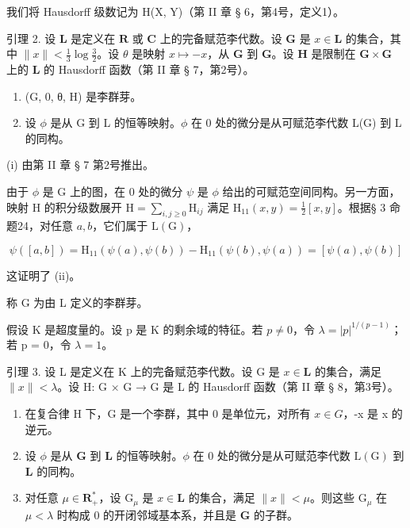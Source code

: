 我们将 Hausdorff 级数记为 H(X, Y)（第 II 章 § 6，第4号，定义1）。

引理 2. 设 \(\mathbf{L}\) 是定义在 \(\mathbf{R}\) 或 \(\mathbf{C}\) 上的完备赋范李代数。设 \(\mathbf{G}\) 是 \(x \in \mathbf{L}\) 的集合，其中 \(\| x \| < \frac{1}{3} \log \frac{3}{2}\)。设 \(\theta\) 是映射 \(x \mapsto -x\)，从 \(\mathbf{G}\) 到 \(\mathbf{G}\)。设 \(\mathbf{H}\) 是限制在 \(\mathbf{G} \times \mathbf{G}\) 上的 \(\mathbf{L}\) 的 Hausdorff 函数（第 II 章 § 7，第2号）。

\begin{enumerate}
\def\labelenumi{(\roman{enumi})}
\item
  (G, 0, θ, H) 是李群芽。
\item
  设 \(\phi\) 是从 G 到 L 的恒等映射。\(\phi\) 在 0 处的微分是从可赋范李代数 L(G) 到 L 的同构。
\end{enumerate}
(i) 由第 II 章 § 7 第2号推出。

由于 \(\phi\) 是 G 上的图，在 0 处的微分 \(\psi\) 是 \(\phi\) 给出的可赋范空间同构。另一方面，映射 H 的积分级数展开 \(\mathrm{H} = \sum_{i,j\geqslant 0}\mathrm{H}_{ij}\) 满足 \(\mathrm{H}_{11}(x,y) = \frac{1}{2} [x,y]\)。根据§ 3 命题24，对任意 \(a,b\)，它们属于 \(\mathrm{L}(\mathrm{G})\)，

\[
\psi ([ a, b ]) = \mathrm{H} _ {1 1} (\psi (a), \psi (b)) - \mathrm{H} _ {1 1} (\psi (b), \psi (a)) = [ \psi (a), \psi (b) ]
\]

这证明了 (ii)。

称 G 为由 L 定义的李群芽。

假设 K 是超度量的。设 p 是 K 的剩余域的特征。若 \(p \neq 0\)，令 \(\lambda = |p|^{1/(p-1)}\)；若 p = 0，令 \(\lambda = 1\)。

引理 3. 设 L 是定义在 K 上的完备赋范李代数。设 G 是 \(x \in \mathbf{L}\) 的集合，满足 \(\| x \| < \lambda\)。设 H: G × G → G 是 L 的 Hausdorff 函数（第 II 章 § 8，第3号）。

\begin{enumerate}
\def\labelenumi{(\roman{enumi})}
\item
  在复合律 H 下，G 是一个李群，其中 0 是单位元，对所有 \(x \in G\)，-x 是 x 的逆元。
\item
  设 \(\phi\) 是从 \(\mathbf{G}\) 到 \(\mathbf{L}\) 的恒等映射。\(\phi\) 在 0 处的微分是从可赋范李代数 \(\mathrm{L}(\mathrm{G})\) 到 \(\mathbf{L}\) 的同构。
\item
  对任意 \(\mu \in \mathbf{R}_+^*\)，设 \(\mathrm{G}_{\mu}\) 是 \(x \in \mathbf{L}\) 的集合，满足 \(\| x \| < \mu\)。则这些 \(\mathrm{G}_{\mu}\) 在 \(\mu < \lambda\) 时构成 0 的开闭邻域基本系，并且是 \(\mathbf{G}\) 的子群。
\end{enumerate}

